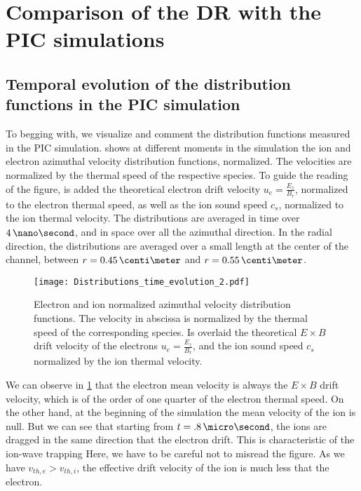 \FloatBarrier
\section{Comparison of the \acs{DR} with the \acs{PIC} simulations}
  \label{sec-DR-results}
  
  

  \subsection{Temporal evolution of the distribution functions in the \acs{PIC} simulation} \label{subsec-VDFpic}
  
  To begging with, we visualize and comment the distribution functions measured in the \ac{PIC} simulation.
   shows at different moments in the simulation the ion and electron azimuthal velocity distribution functions, normalized.
  The velocities are normalized by the thermal speed of the respective species.
  To guide the reading of the figure, is added the  theoretical electron drift velocity $u_e = \frac{E_z}{B_r}$, normalized to the electron thermal speed, as well as the ion sound speed $c_s$, normalized to the ion thermal velocity.
  The distributions are averaged in time over $4\,\nano\second$, and in space over all the azimuthal direction.
  In the radial direction, the distributions are averaged over a small length at the center of the channel, between $r=0.45\,\centi\meter$ and $r=0.55\,\centi\meter$.
  
  \begin{figure}[!hbt]
    \centering
    \texttt{[image: Distributions\_time\_evolution\_2.pdf]}
    \caption{Electron and ion normalized azimuthal velocity distribution functions. The velocity in abscissa is normalized by the thermal speed of the corresponding species. Is overlaid the theoretical $E\times B$ drift velocity of the electrons $u_e = \frac{E_z}{B_r}$, and the ion sound speed $c_s$ normalized by the ion thermal velocity.}
    \label{fig-vdfs_pic_time}
  \end{figure}
  
  We can observe in \cref{fig-vdfs_pic_time} that the electron mean velocity is always the $E \times B$ drift velocity, which is of the order of one quarter of the electron thermal speed.
  On the other hand, at the beginning of the simulation the mean velocity of the ion is null.
  But we can see that starting from $t=.8\,\micro\second$, the ions are dragged in the same direction that the electron drift.
  This is characteristic of the ion-wave trapping \citep{lafleur2017a}
  Here, we have to be careful not to misread the figure.
  As we have $v_{th, e} > v_{th, i}$, the effective drift velocity of the ion is much less that the electron.
  
